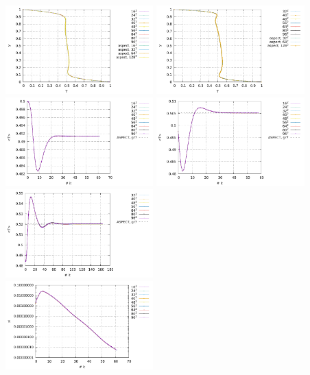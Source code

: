 \begin{center}
\includegraphics[width=5.7cm]{python_codes/fieldstone_110/results_EBA/T_profile_Ra1e5.pdf}
\includegraphics[width=5.7cm]{python_codes/fieldstone_110/results_EBA/T_profile_Ra1e6.pdf}\\
\includegraphics[width=5.7cm]{python_codes/fieldstone_110/results_EBA/T_avrg_Ra1e4.pdf}
\includegraphics[width=5.7cm]{python_codes/fieldstone_110/results_EBA/T_avrg_Ra1e5.pdf}
\includegraphics[width=5.7cm]{python_codes/fieldstone_110/results_EBA/T_avrg_Ra1e6.pdf}\\
\includegraphics[width=5.7cm]{python_codes/fieldstone_110/results_EBA/conv_Ra1e4.pdf}

\end{center}

